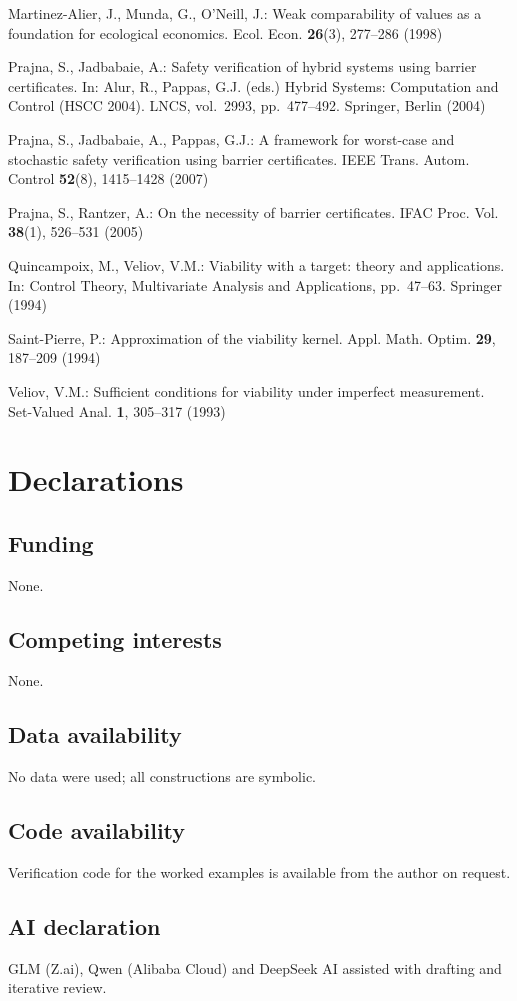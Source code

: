 \documentclass[11pt]{article}
\begin{document}
Martinez-Alier, J., Munda, G., O'Neill, J.: Weak comparability of values
as a foundation for ecological economics. Ecol. Econ. \textbf{26}(3),
277--286 (1998)

Prajna, S., Jadbabaie, A.: Safety verification of hybrid systems using
barrier certificates. In: Alur, R., Pappas, G.J. (eds.) Hybrid Systems:
Computation and Control (HSCC 2004). LNCS, vol.~2993, pp.~477--492.
Springer, Berlin (2004)

Prajna, S., Jadbabaie, A., Pappas, G.J.: A framework for worst-case and
stochastic safety verification using barrier certificates. IEEE Trans.
Autom. Control \textbf{52}(8), 1415--1428 (2007)

Prajna, S., Rantzer, A.: On the necessity of barrier certificates. IFAC
Proc. Vol. \textbf{38}(1), 526--531 (2005)

Quincampoix, M., Veliov, V.M.: Viability with a target: theory and
applications. In: Control Theory, Multivariate Analysis and
Applications, pp.~47--63. Springer (1994)

Saint-Pierre, P.: Approximation of the viability kernel. Appl. Math.
Optim. \textbf{29}, 187--209 (1994)

Veliov, V.M.: Sufficient conditions for viability under imperfect
measurement. Set-Valued Anal. \textbf{1}, 305--317 (1993)

\section*{Declarations}

\subsection*{Funding}

None.

\subsection*{Competing interests}

None.

\subsection*{Data availability}

No data were used; all constructions are symbolic.

\subsection*{Code availability}

Verification code for the worked examples is available from the author on request.

\subsection*{AI declaration}
GLM (Z.ai), Qwen (Alibaba Cloud) and DeepSeek AI assisted with drafting and iterative review.
\end{document}
